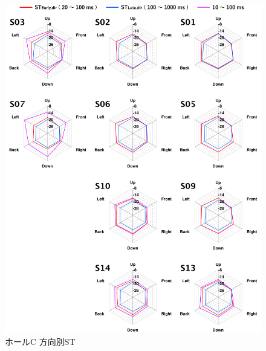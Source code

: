 \documentclass[11pt,a4j]{jreport}
\begin{document}
  \newpage
  \begin{figure}[H]
    \centering
    \includegraphics[scale=.75]{images/realHallDirSt/allPoint/reshaped/c.pdf}
    \caption*{ホールC 方向別ST}
  \end{figure}

  \newpage
\end{document}
